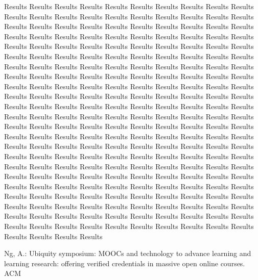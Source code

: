 \documentclass[runningheads]{llncs}
\begin{document}
Results Results Results Results Results Results Results Results Results Results Results Results Results Results Results Results Results Results Results Results Results Results Results Results Results Results Results Results Results Results Results Results Results Results Results Results Results Results Results Results Results Results Results Results Results Results Results Results Results Results Results Results Results Results Results Results Results Results Results Results Results Results Results Results Results Results Results Results Results Results Results Results Results Results Results Results Results Results Results Results Results Results Results Results Results Results Results Results Results Results Results Results Results Results Results Results Results Results Results Results Results Results Results Results Results Results Results Results Results Results Results Results Results Results Results Results Results Results Results Results Results Results Results Results Results Results Results Results Results Results Results Results Results Results Results Results Results Results Results Results Results Results Results Results Results Results Results Results Results Results Results Results Results Results Results Results Results Results Results Results Results Results Results Results Results Results Results Results Results Results Results Results Results Results Results Results Results Results Results Results Results Results Results Results Results Results Results Results Results Results Results Results Results Results Results Results Results Results Results Results Results Results Results Results Results Results Results Results Results Results Results Results Results Results Results Results Results Results Results Results Results Results Results Results Results Results Results Results Results Results Results Results Results Results 

%
%
%
% 
% 
%
\begin{thebibliography}{8}
Ng, A.: Ubiquity symposium: MOOCs and technology to advance learning and learning research: offering verified credentials in massive open online courses. ACM

\end{thebibliography}
\end{document}

